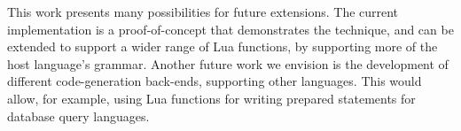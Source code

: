 \documentclass[english]{llncs}
\begin{document}
This work presents many possibilities for future extensions. The current
implementation is a proof-of-concept that demonstrates the technique,
and can be extended to support a wider range of Lua functions, by
supporting more of the host language's grammar. Another future work
we envision is the development of different code-generation back-ends,
supporting other languages. This would allow, for example, using
Lua functions for writing prepared statements for database query
languages.




\end{document}
